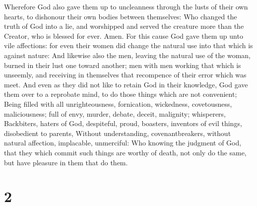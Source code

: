  Wherefore God also gave them up to uncleanness through the
lusts of their own hearts, to dishonour their own bodies between
themselves:  Who changed the truth of God into a lie, and
worshipped and served the creature more than the Creator, who is blessed
for ever. Amen.  For this cause God gave them up unto vile
affections: for even their women did change the natural use into that
which is against nature:  And likewise also the men,
leaving the natural use of the woman, burned in their lust one toward
another; men with men working that which is unseemly, and receiving in
themselves that recompence of their error which was meet. 
And even as they did not like to retain God in their knowledge, God gave
them over to a reprobate mind, to do those things which are not
convenient;  Being filled with all unrighteousness,
fornication, wickedness, covetousness, maliciousness; full of envy,
murder, debate, deceit, malignity; whisperers,  Backbiters,
haters of God, despiteful, proud, boasters, inventors of evil things,
disobedient to parents,  Without understanding,
covenantbreakers, without natural affection, implacable, unmerciful:
 Who knowing the judgment of God, that they which commit
such things are worthy of death, not only do the same, but have pleasure
in them that do them.

\hypertarget{section-1}{%
\section{2}\label{section-1}}


